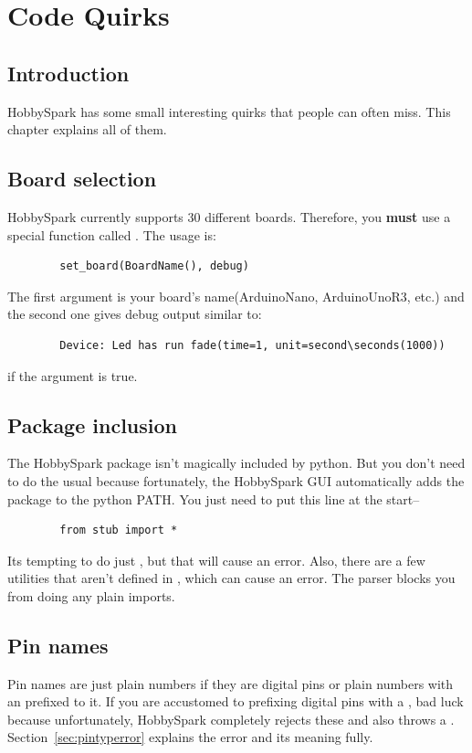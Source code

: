 	\chapter{Code Quirks}
	\section{Introduction}
	HobbySpark has some small interesting quirks that people can often miss. This chapter explains all of them.
	\section{Board selection}
	HobbySpark currently supports 30 different boards. Therefore, you \textbf{must} use a special function called . The usage is:
	\begin{lstlisting}
		set_board(BoardName(), debug)
	\end{lstlisting}
	The first argument is your board's name(ArduinoNano, ArduinoUnoR3, etc.) and the second one gives debug output similar to:
	\begin{lstlisting}
		Device: Led has run fade(time=1, unit=second\seconds(1000))
	\end{lstlisting}
	if the argument is true.
	
	\section{Package inclusion}
	The HobbySpark package isn't magically included by python. But you don't need to do the usual  because fortunately, the HobbySpark GUI automatically adds the package to the python PATH. You just need to put this line at the start--
	
	\begin{lstlisting}
		from stub import *
	\end{lstlisting}  
	
	Its tempting to do just , but that will cause an error. Also, there are a few utilities that aren't defined in , which can cause an error. The parser blocks you from doing any plain imports.
	
	\newpage
	\section{Pin names}
	Pin names are just plain numbers if they are digital pins or plain numbers with an  prefixed to it. If you are accustomed to prefixing digital pins with a , bad luck because unfortunately, HobbySpark completely rejects these and also throws a . Section~\ref{sec:pintyperror} explains the error and its meaning fully.
	
